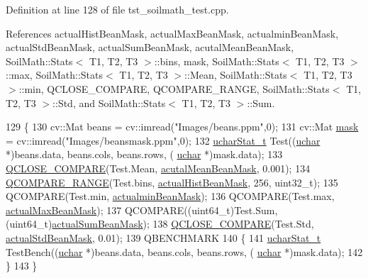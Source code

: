 Definition at line 128 of file tst\+\_\+soilmath\+\_\+test.\+cpp.



References actual\+Hist\+Bean\+Mask, actual\+Max\+Bean\+Mask, actualmin\+Bean\+Mask, actual\+Std\+Bean\+Mask, actual\+Sum\+Bean\+Mask, acutal\+Mean\+Bean\+Mask, Soil\+Math\+::\+Stats$<$ T1, T2, T3 $>$\+::bins, mask, Soil\+Math\+::\+Stats$<$ T1, T2, T3 $>$\+::max, Soil\+Math\+::\+Stats$<$ T1, T2, T3 $>$\+::\+Mean, Soil\+Math\+::\+Stats$<$ T1, T2, T3 $>$\+::min, Q\+C\+L\+O\+S\+E\+\_\+\+C\+O\+M\+P\+A\+R\+E, Q\+C\+O\+M\+P\+A\+R\+E\+\_\+\+R\+A\+N\+G\+E, Soil\+Math\+::\+Stats$<$ T1, T2, T3 $>$\+::\+Std, and Soil\+Math\+::\+Stats$<$ T1, T2, T3 $>$\+::\+Sum.


\begin{DoxyCode}
129 \{
130     cv::Mat beans = cv::imread(\textcolor{stringliteral}{"Images/beans.ppm"},0);
131     cv::Mat \hyperlink{_gen_blob_8m_a5d76cc2129e79ba1941d2cc2f53b9e8e}{mask} = cv::imread(\textcolor{stringliteral}{"Images/beansmask.ppm"},0);
132     \hyperlink{class_soil_math_1_1_stats}{ucharStat\_t} Test((\hyperlink{_soil_math_types_8h_a65f85814a8290f9797005d3b28e7e5fc}{uchar} *)beans.data, beans.cols, beans.rows, (
      \hyperlink{_soil_math_types_8h_a65f85814a8290f9797005d3b28e7e5fc}{uchar} *)mask.data);
133     \hyperlink{tst__soilmath__test_8cpp_a8a8e087bc3a2f5ca88371122b7c8e9cc}{QCLOSE\_COMPARE}(Test.Mean, \hyperlink{beanhisttest_8h_a8a6727317fd8384c82a8215fdf292073}{acutalMeanBeanMask}, 0.001);
134     \hyperlink{tst__soilmath__test_8cpp_a72a3de1ae27adae72631c94b1eaaea56}{QCOMPARE\_RANGE}(Test.bins, \hyperlink{beanhisttest_8h_aa70a1287fa02b7677d9a2dd5377f9933}{actualHistBeanMask}, 256, uint32\_t);
135     QCOMPARE(Test.min, \hyperlink{beanhisttest_8h_abd380182491950c1e704def6fab34c21}{actualminBeanMask});
136     QCOMPARE(Test.max, \hyperlink{beanhisttest_8h_a354ff38fb7fc4f471e9c3247213b7ec7}{actualMaxBeanMask});
137     QCOMPARE((uint64\_t)Test.Sum, (uint64\_t)\hyperlink{beanhisttest_8h_af00b8daba38848258fa94b96a45308f2}{actualSumBeanMask});
138     \hyperlink{tst__soilmath__test_8cpp_a8a8e087bc3a2f5ca88371122b7c8e9cc}{QCLOSE\_COMPARE}(Test.Std, \hyperlink{beanhisttest_8h_a8fde1bc8cc700165840fe6f4aad2e18a}{actualStdBeanMask}, 0.01);
139     QBENCHMARK
140     \{
141         \hyperlink{class_soil_math_1_1_stats}{ucharStat\_t} TestBench((\hyperlink{_soil_math_types_8h_a65f85814a8290f9797005d3b28e7e5fc}{uchar} *)beans.data, beans.cols, beans.rows, (
      \hyperlink{_soil_math_types_8h_a65f85814a8290f9797005d3b28e7e5fc}{uchar} *)mask.data);
142     \}
143 \}
\end{DoxyCode}
\hypertarget{class_soil_math___test_aca4ac3b1b8790bd74559e880522559c4}{}
